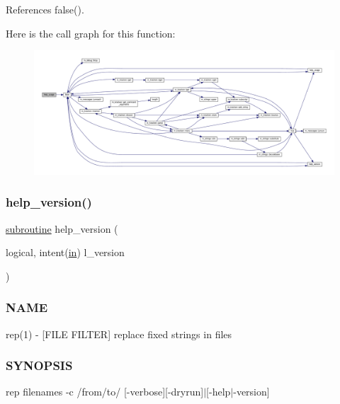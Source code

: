 References false().

Here is the call graph for this function\+:
\nopagebreak
\begin{figure}[H]
\begin{center}
\leavevmode
\includegraphics[width=350pt]{rep_8f90_a3e09a3b52ee8fb04eeb93fe5761626a8_cgraph}
\end{center}
\end{figure}
\mbox{\label{rep_8f90_a39c21619b08a3c22f19e2306efd7f766}} 
\subsubsection{\texorpdfstring{help\+\_\+version()}{help\_version()}}
{\footnotesize\ttfamily \hyperlink{M__stopwatch_83_8txt_acfbcff50169d691ff02d4a123ed70482}{subroutine} help\+\_\+version (\begin{DoxyParamCaption}\item[{logical, intent(\hyperlink{M__journal_83_8txt_afce72651d1eed785a2132bee863b2f38}{in})}]{l\+\_\+version }\end{DoxyParamCaption})}



\subsubsection*{N\+A\+ME}

rep(1) -\/ \mbox{[}F\+I\+LE F\+I\+L\+T\+ER\mbox{]} replace fixed strings in files \subsubsection*{S\+Y\+N\+O\+P\+S\+IS}

rep filenames -\/c /from/to/ \mbox{[}-\/verbose\mbox{]}\mbox{[}-\/dryrun\mbox{]}$\vert$\mbox{[}-\/help$\vert$-\/version\mbox{]}

